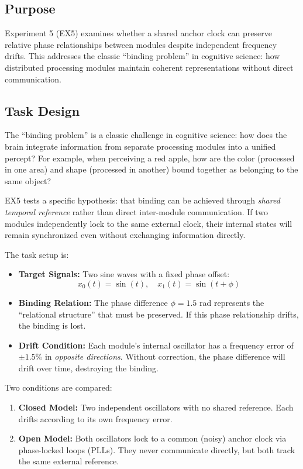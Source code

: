 \documentclass{article}
\begin{document}
\subsection{Purpose}
Experiment 5 (EX5) examines whether a shared anchor clock can preserve relative phase relationships between modules despite independent frequency drifts. This addresses the classic ``binding problem'' in cognitive science: how distributed processing modules maintain coherent representations without direct communication.

\subsection{Task Design}
The ``binding problem'' is a classic challenge in cognitive science: how does the brain integrate information from separate processing modules into a unified percept? For example, when perceiving a red apple, how are the color (processed in one area) and shape (processed in another) bound together as belonging to the same object?

EX5 tests a specific hypothesis: that binding can be achieved through \textit{shared temporal reference} rather than direct inter-module communication. If two modules independently lock to the same external clock, their internal states will remain synchronized even without exchanging information directly.

The task setup is:
\begin{itemize}
    \item \textbf{Target Signals:} Two sine waves with a fixed phase offset:
    \begin{equation}
        x_0(t) = \sin(t), \quad x_1(t) = \sin(t + \phi)
    \end{equation}
    \item \textbf{Binding Relation:} The phase difference $\phi = 1.5$ rad represents the ``relational structure'' that must be preserved. If this phase relationship drifts, the binding is lost.
    \item \textbf{Drift Condition:} Each module's internal oscillator has a frequency error of $\pm 1.5\%$ in \emph{opposite directions}. Without correction, the phase difference will drift over time, destroying the binding.
\end{itemize}

Two conditions are compared:
\begin{enumerate}
    \item \textbf{Closed Model:} Two independent oscillators with no shared reference. Each drifts according to its own frequency error.
    \item \textbf{Open Model:} Both oscillators lock to a common (noisy) anchor clock via phase-locked loops (PLLs). They never communicate directly, but both track the same external reference.
\end{enumerate}
\end{document}
